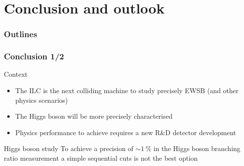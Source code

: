 \documentclass{beamer}
\begin{document}
    
\section{Conclusion and outlook} 
\begin{frame}
  \frametitle{Outlines}
  \begin{minipage}{\textwidth}
  \footnotesize
    \tableofcontents[currentsection,hideothersubsections, 
    sectionstyle=show/shaded]
  \end{minipage}
\end{frame}

\begin{frame}
  \frametitle{Conclusion 1/2}

  \begin{block}{Context}
    \begin{itemize}
      \item The ILC is the next colliding machine to study precisely EWSB (and other physics scenarios)
      \item The Higgs boson will be more precisely characterised
      \item Physics performance to achieve requires a new R\&D detector development 
    \end{itemize}
  \end{block}

  \begin{block}{Higgs boson study}
    To achieve a precision of $\sim 1~\%$ in the Higgs boson branching ratio measurement a simple sequential cuts is not the best option
  \end{block}

  \vspace{-0.23cm}

\end{frame}
\end{document}
